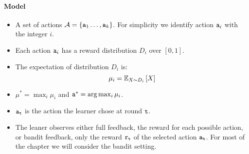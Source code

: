 \paragraph{Model}
\begin{itemize}
\item A set of actions $\mathcal{A}=\left\{ {\tt a}_{1}\dots,{\tt a}_{k}\right\} $. For simplicity we identify action ${\tt a}_i$ with the integer $i$.
\item Each action ${\tt a}_{i}$ has a reward distribution $D_{i}$ over
$[0,1]$.
\item The expectation of distribution $D_{i}$ is:
\[
\mu_{i}=\mathbb{E}_{X\sim D_{i}}\left[X\right]
\]
\item $\mu^{*}= \max_{i}\mu_{i}$ and ${\tt a}^*=\arg\max_i\mu_i$.
\item ${\tt a}_{{\tt t}}$ is the action the learner chose at round ${\tt t}$.
\item The leaner observes either full feedback, the reward for each possible action, or bandit feedback, only the reward ${\tt r}_{\tt t}$ of the selected action ${\tt a}_{\tt t}$. For most of the chapter we will consider the bandit setting.
\end{itemize}

